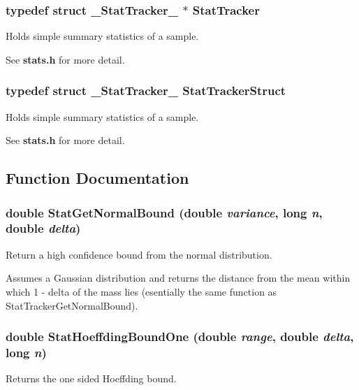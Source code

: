 \subsubsection{\setlength{\rightskip}{0pt plus 5cm}typedef struct {\bf \_\-Stat\-Tracker\_\-} $\ast$ {\bf Stat\-Tracker}}\label{stats_8h_a1}


Holds simple summary statistics of a sample. 

See {\bf stats.h} for more detail. 
\subsubsection{\setlength{\rightskip}{0pt plus 5cm}typedef struct {\bf \_\-Stat\-Tracker\_\-}  {\bf Stat\-Tracker\-Struct}}\label{stats_8h_a0}


Holds simple summary statistics of a sample. 

See {\bf stats.h} for more detail. 

\subsection{Function Documentation}
\subsubsection{\setlength{\rightskip}{0pt plus 5cm}double Stat\-Get\-Normal\-Bound (double {\em variance}, long {\em n}, double {\em delta})}\label{stats_8h_a10}


Return a high confidence bound from the normal distribution. 

Assumes a Gaussian distribution and returns the distance from the mean within which 1 - delta  of the mass lies (esentially the same function as Stat\-Tracker\-Get\-Normal\-Bound). 
\subsubsection{\setlength{\rightskip}{0pt plus 5cm}double Stat\-Hoeffding\-Bound\-One (double {\em range}, double {\em delta}, long {\em n})}\label{stats_8h_a11}


Returns the one sided Hoeffding bound. 

